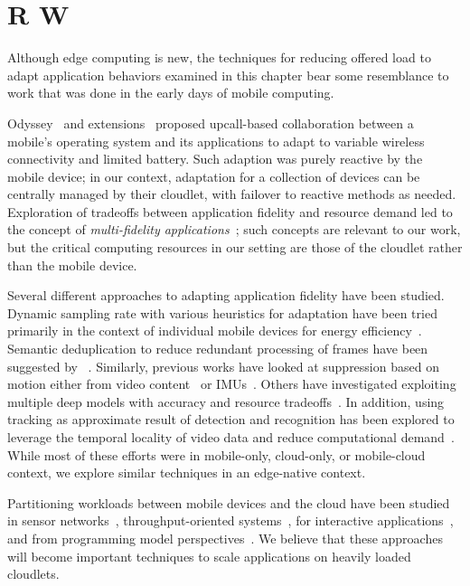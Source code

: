 \section{R W}
\label{sec: workload-related}

Although edge computing is new, the techniques for reducing offered load to
adapt application behaviors examined in this chapter bear some resemblance to
work that was done in the early days of mobile computing.

Odyssey~\cite{Noble1997} and extensions~\cite{Flinn1999} proposed upcall-based
collaboration between a mobile's operating system and its applications to adapt
to variable wireless connectivity and limited battery. Such adaption was purely
reactive by the mobile device; in our context, adaptation for a collection of
devices can be centrally managed by their cloudlet, with failover to reactive
methods as needed. Exploration of tradeoffs between application fidelity and
resource demand led to the concept of {\em multi-fidelity
applications}~\cite{Satya1999}; such concepts are relevant to our work, but the
critical computing resources in our setting are those of the cloudlet rather
than the mobile device.

Several different approaches to adapting application fidelity have been studied.
Dynamic sampling rate with various heuristics for adaptation have been tried
primarily in the context of individual mobile devices for energy
efficiency~\cite{lorincz2009mercury, lorincz2008resource, vallina2012energy,
lane2010survey}. Semantic deduplication to reduce redundant processing of frames
have been suggested by ~\cite{Hu2015, kang2017noscope, hsieh2018focus,
zhang2015design}. Similarly, previous works have looked at suppression based on
motion either from video content~\cite{naderiparizi2017glimpse,
lebeckcollaborative} or IMUs~\cite{jain2015overlay}. Others have investigated
exploiting multiple deep models with accuracy and resource
tradeoffs~\cite{han2016mcdnn,jiang2018chameleon}. In addition, using tracking as
approximate result of detection and recognition has been explored to leverage
the temporal locality of video data and reduce computational
demand~\cite{wang2017scalable, chen2015glimpse, you1999hybrid}. While most of
these efforts were in mobile-only, cloud-only, or mobile-cloud context, we
explore similar techniques in an edge-native context.


Partitioning workloads between mobile devices and the cloud have been
studied in sensor networks~\cite{newton2009wishbone},
throughput-oriented systems~\cite{cuervo2010maui, yi2017lavea}, for
interactive applications~\cite{ra2011odessa, chen2015glimpse}, and
from programming model perspectives~\cite{balan2003tactics}. We believe
that these approaches will become important techniques to scale
applications on heavily loaded cloudlets.